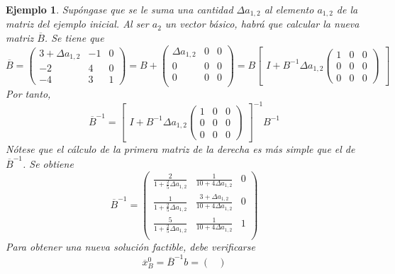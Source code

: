 \documentclass[11pt]{report}
\theoremstyle{mytheorem}
\theoremstyle{mydefinition}
\theoremstyle{myexample}
\newtheorem*{example}{Ejemplo}
\begin{document}
\begin{example}
Supóngase que se le suma una cantidad $\Delta a_{1,2}$ al elemento $a_{1,2}$ de la matriz del ejemplo inicial. Al ser $a_2$ un vector básico, habrá que calcular la nueva matriz $\overline{B}$. Se tiene que
\[\overline{B} = \begin{pmatrix}
    3+\Delta a_{1,2} & -1 & 0 \\
    -2 & 4 & 0 \\
    -4 & 3 & 1
\end{pmatrix} = B + \begin{pmatrix}
    \Delta a_{1,2} & 0 & 0 \\
    0 & 0 & 0 \\
    0 & 0 & 0 \\
    \end{pmatrix} = B\begin{bmatrix}
        I+B^{-1}\Delta a_{1,2}\begin{pmatrix}
            1 & 0 & 0 \\
            0 & 0 & 0 \\
            0 & 0 & 0
        \end{pmatrix}
    \end{bmatrix}\]
    Por tanto,
    \[\overline{B}^{-1} =\begin{bmatrix}
        I+B^{-1}\Delta a_{1,2}\begin{pmatrix}
            1 & 0 & 0 \\
            0 & 0 & 0 \\
            0 & 0 & 0
        \end{pmatrix}
    \end{bmatrix}^{-1}B^{-1} \]
    Nótese que el cálculo de la primera matriz de la derecha es más simple que el de $\overline{B}^{-1}$. Se obtiene
\[\overline{B}^{-1} = \begin{pmatrix}
    \displaystyle\frac{2}{1+\frac{2}{5}\Delta a_{1,2}} & \displaystyle\frac{1}{10+4 \Delta a_{1,2}} & 0 \\[15pt]
    \displaystyle\frac{1}{1+\frac{2}{5}\Delta a_{1,2}} & \displaystyle\frac{3+\Delta a_{1,2}}{10+4 \Delta a_{1,2}} & 0 \\[15pt]
    \displaystyle\frac{5}{1+\frac{2}{5}\Delta a_{1,2}} & \displaystyle\frac{1}{10+4 \Delta a_{1,2}} & 1 \\
\end{pmatrix}\]
Para obtener una nueva solución factible, debe verificarse
\[\overline{x}^0_B = \overline{B}^{-1}b = \begin{pmatrix}

\end{pmatrix}\]
\end{example}
\end{document}
